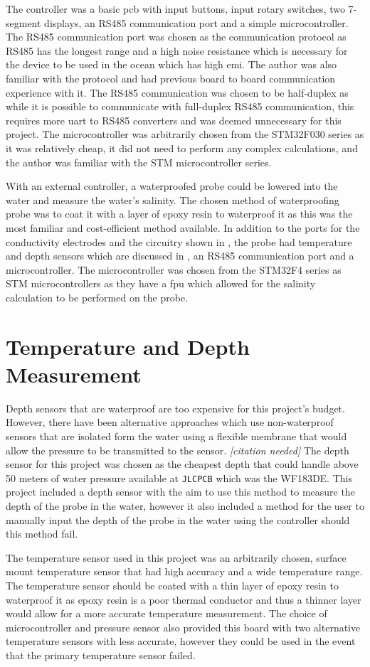 The controller was a basic \gls{pcb} with input buttons, input rotary switches, two 7-segment displays, an RS485 communication port and a simple microcontroller.
The RS485 communication port was chosen as the communication protocol as RS485 has the longest range and a high noise resistance which is necessary for the device to be used in the ocean which has high \gls{emi}.
The author was also familiar with the protocol and had previous board to board communication experience with it.
The RS485 communication was chosen to be half-duplex as while it is possible to communicate with full-duplex RS485 communication, this requires more \gls{uart} to RS485 converters and was deemed unnecessary for this project.
The microcontroller was arbitrarily chosen from the STM32F030 series as it was relatively cheap, it did not need to perform any complex calculations, and the author was familiar with the STM microcontroller series.

With an external controller, a waterproofed probe could be lowered into the water and measure the water's salinity.
The chosen method of waterproofing probe was to coat it with a layer of epoxy resin to waterproof it as this was the most familiar and cost-efficient method available.
In addition to the ports for the conductivity electrodes and the circuitry shown in , the probe had temperature and depth sensors which are discussed in , an RS485 communication port and a microcontroller.
The microcontroller was chosen from the STM32F4 series as STM microcontrollers as they have a \gls{fpu} which allowed for the salinity calculation to be performed on the probe.

\section{Temperature and Depth Measurement}\label{sec:temp-depth-measurement}

Depth sensors that are waterproof are too expensive for this project's budget.
However, there have been alternative approaches which use non-waterproof sensors that are isolated form the water using a flexible membrane that would allow the pressure to be transmitted to the sensor. \textit{[citation needed]}
The depth sensor for this project was chosen as the cheapest depth that could handle above 50 meters of water pressure available at \texttt{JLCPCB} which was the WF183DE.
This project included a depth sensor with the aim to use this method to measure the depth of the probe in the water, however it also included a method for the user to manually input the depth of the probe in the water using the controller should this method fail.

The temperature sensor used in this project was an arbitrarily chosen, surface mount temperature sensor that had high accuracy and a wide temperature range.
The temperature sensor should be coated with a thin layer of epoxy resin to waterproof it as epoxy resin is a poor thermal conductor and thus a thinner layer would allow for a more accurate temperature measurement.
The choice of microcontroller and pressure sensor also provided this board with two alternative temperature sensors with less accurate, however they could be used in the event that the primary temperature sensor failed.